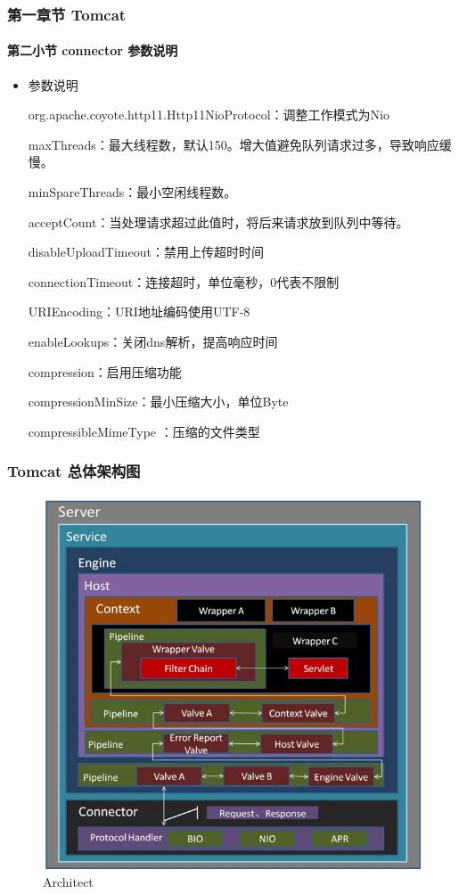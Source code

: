 \documentclass{beamer}
\begin{document}
\begin{frame}
\frametitle{第一章节 Tomcat }
\framesubtitle{第二小节 connector 参数说明}
\begin{itemize}
	
	\item 参数说明
	\small
	
	org.apache.coyote.http11.Http11NioProtocol：调整工作模式为Nio
	
	maxThreads：最大线程数，默认150。增大值避免队列请求过多，导致响应缓慢。
	
	minSpareThreads：最小空闲线程数。
	
	acceptCount：当处理请求超过此值时，将后来请求放到队列中等待。
	
	disableUploadTimeout：禁用上传超时时间
	
	connectionTimeout：连接超时，单位毫秒，0代表不限制
	
	URIEncoding：URI地址编码使用UTF-8
	
	enableLookups：关闭dns解析，提高响应时间
	
	compression：启用压缩功能
	
	compressionMinSize：最小压缩大小，单位Byte
	
	compressibleMimeType ：压缩的文件类型
	
\end{itemize}
\end{frame}

\begin{frame}
\frametitle{Tomcat 总体架构图}
\begin{figure}[ht]	
	\centering
	\includegraphics[scale=0.40]{img/Architect.png}
	\caption{Architect}
	\label{fig:pathdemo1}
\end{figure}

\end{frame}
\end{document}
